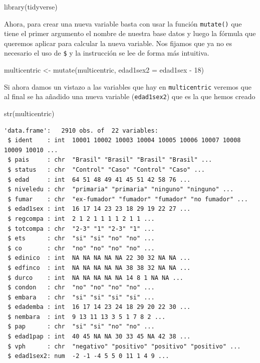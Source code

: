 \documentclass[
]{book}
\newenvironment{Shaded}{\begin{snugshade}}{\end{snugshade}}
\newcommand{\AttributeTok}[1]{\textcolor[rgb]{0.77,0.63,0.00}{#1}}
\newcommand{\DecValTok}[1]{\textcolor[rgb]{0.00,0.00,0.81}{#1}}
\newcommand{\FunctionTok}[1]{\textcolor[rgb]{0.00,0.00,0.00}{#1}}
\newcommand{\NormalTok}[1]{#1}
\newcommand{\OtherTok}[1]{\textcolor[rgb]{0.56,0.35,0.01}{#1}}
\newcommand{\SpecialCharTok}[1]{\textcolor[rgb]{0.00,0.00,0.00}{#1}}
\begin{document}
\begin{Shaded}
\begin{Highlighting}[]
\FunctionTok{library}\NormalTok{(tidyverse)}
\end{Highlighting}
\end{Shaded}

Ahora, para crear una nueva variable basta con usar la función \texttt{mutate()} que tiene el primer argumento el nombre de nuestra base datos y luego la fórmula que queremos aplicar para calcular la nueva variable. Nos fijamos que ya no es necesario el uso de \texttt{\$} y la instrucción se lee de forma más intuitiva.

\begin{Shaded}
\begin{Highlighting}[]
\NormalTok{multicentric }\OtherTok{\textless{}{-}} \FunctionTok{mutate}\NormalTok{(multicentric, }\AttributeTok{edad1sex2 =}\NormalTok{ edad1sex }\SpecialCharTok{{-}} \DecValTok{18}\NormalTok{)}
\end{Highlighting}
\end{Shaded}

Si ahora damos un vistazo a las variables que hay en \texttt{multicentric} veremos que al final se ha añadido una nueva variable (\texttt{edad1sex2}) que es la que hemos creado

\begin{Shaded}
\begin{Highlighting}[]
\FunctionTok{str}\NormalTok{(multicentric)}
\end{Highlighting}
\end{Shaded}

\begin{verbatim}
'data.frame':   2910 obs. of  22 variables:
 $ ident    : int  10001 10002 10003 10004 10005 10006 10007 10008 10009 10010 ...
 $ pais     : chr  "Brasil" "Brasil" "Brasil" "Brasil" ...
 $ status   : chr  "Control" "Caso" "Control" "Caso" ...
 $ edad     : int  64 51 48 49 41 45 51 42 58 76 ...
 $ niveledu : chr  "primaria" "primaria" "ninguno" "ninguno" ...
 $ fumar    : chr  "ex-fumador" "fumador" "fumador" "no fumador" ...
 $ edad1sex : int  16 17 14 23 23 18 29 19 22 27 ...
 $ regcompa : int  2 1 2 1 1 1 1 2 1 1 ...
 $ totcompa : chr  "2-3" "1" "2-3" "1" ...
 $ ets      : chr  "si" "si" "no" "no" ...
 $ co       : chr  "no" "no" "no" "no" ...
 $ edinico  : int  NA NA NA NA NA 22 30 32 NA NA ...
 $ edfinco  : int  NA NA NA NA NA 38 38 32 NA NA ...
 $ durco    : int  NA NA NA NA NA 14 8 1 NA NA ...
 $ condon   : chr  "no" "no" "no" "no" ...
 $ embara   : chr  "si" "si" "si" "si" ...
 $ edademba : int  16 17 14 23 24 18 29 20 22 30 ...
 $ nembara  : int  9 13 11 13 3 5 1 7 8 2 ...
 $ pap      : chr  "si" "si" "no" "no" ...
 $ edad1pap : int  40 45 NA NA 30 33 45 NA 42 38 ...
 $ vph      : chr  "negativo" "positivo" "positivo" "positivo" ...
 $ edad1sex2: num  -2 -1 -4 5 5 0 11 1 4 9 ...
\end{verbatim}
\end{document}
